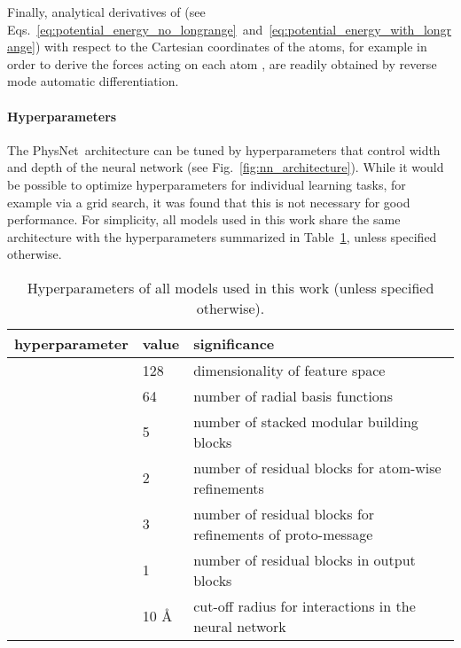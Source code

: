 \documentclass[12pt]{article}
\newcommand{\nn}{PhysNet}
\begin{document}
Finally, analytical derivatives of  (see
Eqs.~\ref{eq:potential_energy_no_longrange}~and~\ref{eq:potential_energy_with_longrange})
with respect to the Cartesian coordinates
 of the atoms, for example in
order to derive the forces  acting on each atom , are
readily obtained by reverse mode automatic
differentiation.\cite{baydin2018automatic}

\paragraph{Hyperparameters}
The \nn\ architecture can be tuned by hyperparameters that control
width and depth of the neural network (see
Fig.~\ref{fig:nn_architecture}). While it would be possible to
optimize hyperparameters for individual learning tasks, for example
via a grid search, it was found that this is not necessary for good
performance. For simplicity, all models used in this work share the
same architecture with the hyperparameters summarized in
Table~\ref{tab:hyperparameters}, unless specified otherwise.
\begin{table}[htbp]
\captionsetup{width=0.85\textwidth}
\caption{Hyperparameters of all models used in this work (unless specified otherwise).}
\label{tab:hyperparameters}
	
\centering
\begin{tabular}{ l l l }
\toprule
\textbf{hyperparameter} & \textbf{value} & \textbf{significance} \\
\midrule
  & \num{128} & dimensionality of feature space \\
\addlinespace[1pt]
  & \num{64} & number of radial basis functions \\
\addlinespace[1pt]
 & \num{5} & number of stacked modular building blocks\\
\addlinespace[1pt]
 & \num{2} & number of residual blocks for atom-wise refinements\\
\addlinespace[1pt]
 & \num{3} & number of residual blocks for refinements of proto-message\\
\addlinespace[1pt]
 & \num{1} & number of residual blocks in output blocks\\
\addlinespace[1pt]
 & 10 \AA & cut-off radius for interactions in the neural network\\
\bottomrule
\end{tabular}
\end{table}
\end{document}
